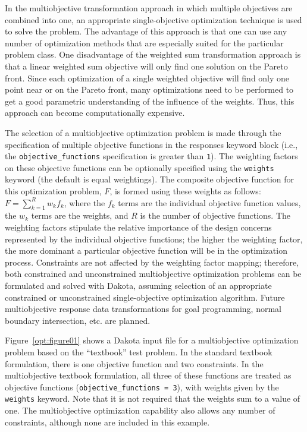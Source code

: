 In the multiobjective transformation approach in which multiple
objectives are combined into one, an appropriate single-objective
optimization technique is used to solve the problem. The advantage of
this approach is that one can use any number of optimization methods
that are especially suited for the particular problem class. One
disadvantage of the weighted sum transformation approach is that a
linear weighted sum objective will only find one solution on 
the Pareto front.  
Since each optimization of a single
weighted objective will find only one point near or on the Pareto
front, many optimizations need to be performed to get a good
parametric understanding of the influence of the weights.
Thus, this approach can become computationally expensive. 

The selection of a multiobjective optimization problem is made through
the specification of multiple objective functions in the responses
keyword block (i.e., the \texttt{objective\_functions}
specification is greater than \texttt{1}). The weighting factors on
these objective functions can be optionally specified using the
\texttt{weights} keyword (the default is equal
weightings). The composite objective function for this optimization
problem, $F$, is formed using these weights as follows:
$F=\sum_{k=1}^{R}w_{k}f_{k}$, where the $f_{k}$ terms are the
individual objective function values, the $w_{k}$ terms are the
weights, and $R$ is the number of objective functions. The weighting
factors stipulate the relative importance of the design concerns
represented by the individual objective functions; the higher the
weighting factor, the more dominant a particular objective function
will be in the optimization process. Constraints are not affected by
the weighting factor mapping; therefore, both constrained and
unconstrained multiobjective optimization problems can be formulated
and solved with Dakota, assuming selection of an appropriate
constrained or unconstrained single-objective optimization algorithm.
Future multiobjective response data transformations for goal
programming, normal boundary intersection, etc. are planned.

Figure~\ref{opt:figure01} shows a Dakota input file for a
multiobjective optimization problem based on the ``textbook'' test
problem. 
In the standard textbook formulation,
there is one objective function and two constraints. In the
multiobjective textbook formulation, all three of these functions are
treated as objective functions (\texttt{objective\_functions =
  3}), with weights given by the \texttt{weights}
keyword. Note that it is not required that the weights sum to a value
of one. The multiobjective optimization capability also allows any
number of constraints, although none are included in this example.

